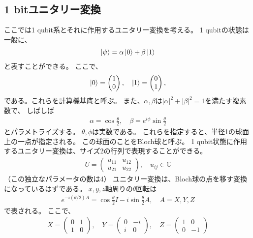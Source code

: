\documentclass[]{ltjsarticle}
\newcommand{\complex}{\mathbb{C}}
\begin{document}
\subsection{1 bitユニタリー変換}
ここでは1 qubit系とそれに作用するユニタリー変換を考える。
1 qubitの状態は一般に、
\begin{align}
    \ket{\psi} 
    =
    \alpha \ket{0} + \beta\ket{1}
\end{align}
と表すことができる。
ここで、
\begin{align}
    \ket{0} 
    = 
    \begin{pmatrix}
    1 \\ 0    
    \end{pmatrix}, \quad 
    \ket{1} 
    = 
    \begin{pmatrix}
    0 \\ 1    
    \end{pmatrix},
\end{align}
である。これらを計算機基底と呼ぶ。
また、$\alpha, \beta$は$|\alpha|^2 + |\beta|^2 = 1$を満たす複素数で、
しばしば
\begin{align}
    \alpha = \cos\frac{\theta}{2}, \quad 
    \beta = e^{i\phi}\sin\frac{\theta}{2}
\end{align}
とパラメトライズする。
$\theta, \phi$は実数である。
これらを指定すると、半径1の球面上の一点が指定される。
この球面のことをBloch球と呼ぶ。
1 qubit状態に作用するユニタリー変換は、サイズ2の行列で表現することができる。
\begin{align}
    U = 
    \begin{pmatrix}
        u_{11} & u_{12} \\
        u_{21} & u_{22}
    \end{pmatrix}, \quad u_{ij} \in \complex
\end{align}
（この独立なパラメータの数は4）
ユニタリー変換は、Bloch球の点を移す変換になっているはずである。
$x,y,z$軸周りの$\theta$回転は
\begin{align}
    e^{-i(\theta/2)A} = \cos\frac{\theta}{2}I - i\sin\frac{\theta}{2}A,
    \quad 
    A = X, Y, Z
\end{align}
で表される。
ここで、
\begin{align}
    X = 
    \begin{pmatrix}
    0 & 1 \\ 1 & 0     
    \end{pmatrix},\quad 
    Y = 
    \begin{pmatrix}
    0 & -i \\ i & 0     
    \end{pmatrix},\quad 
    Z = 
    \begin{pmatrix}
    1 & 0 \\ 0 & -1     
    \end{pmatrix} 
\end{align}
\end{document}
